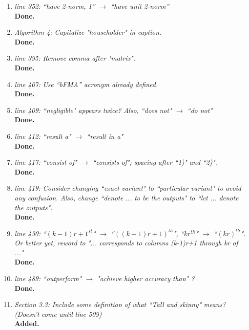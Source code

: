 \documentclass[final,onefignum,onetabnum]{siamart190516}
\begin{document}
\begin{enumerate}
	
	\item {\it line 352: ``have 2-norm, 1'' $\rightarrow$ ``have unit 2-norm''}\\
	{\bf Done.}
	
	\item {\it Algorithm 4: Capitalize "householder" in caption.}\\
	{\bf Done.}
	
	\item {\it line 395:  Remove comma after "matrix".}\\
	{\bf Done.}
	
	\item {\it line 407:  Use ``bFMA'' acronym already defined. }\\
	{\bf Done.}
	
	\item {\it line 409:  ``negligible" appears twice? Also, ``does not" $\rightarrow$ ``do not"}\\
	{\bf Done.}	
	
	\item {\it line 412: ``result a" $\rightarrow$ ``result in a"}\\
	{\bf Done.}
	
	\item{\it line 417: ``consist of" $\rightarrow$ ``consists of"; spacing after ``1)" and ``2)".}\\
	{\bf Done.}
	
	\item {\it line 419: Consider changing ``exact variant" to ``particular variant" to avoid any confusion. Also, change ``denote ... to be the outputs" to ``let ... denote the outputs".}\\
	{\bf Done.}
	
	\item {\it line 430: ``$(k-1)r+1^{st}$" $\rightarrow$ ``$((k-1)r+1)^{th}$", ``$kr^{th}$" $\rightarrow$ ``$(kr)^{th}$". Or better yet, reword to "... corresponds to columns (k-1)r+1 through kr of ..."}\\
	{\bf Done.}
	
	\item {\it line 489: ``outperform" $\rightarrow$ "achieve higher accuracy than" ?}\\
	{\bf Done.}
	
	\item {\it Section 3.3: Include some definition of what ``Tall and skinny" means? (Doesn't come until line 509)}\\
	{\bf Added.}
	

\end{enumerate}
\end{document}
